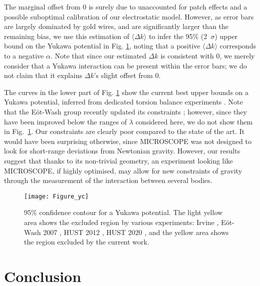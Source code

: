 \documentclass[12pt]{iopart}
\begin{document}
The marginal offset from 0 is surely due to unaccounted for patch effects and a possible suboptimal calibration of our electrostatic model. However, as error bars are largely dominated by gold wires, and are significantly larger than the remaining bias, we use this estimation of $\langle \Delta k \rangle$ to infer the 95\% (2~$\sigma$) upper bound on the Yukawa potential in Fig. \ref{fig_yc}, noting that a positive $\langle \Delta k \rangle$ corresponds to a negative $\alpha$.
Note that since our estimated $\Delta k$ is consistent with 0, we merely consider that a Yukawa interaction can be present within the error bars; we do not claim that it explains $\Delta k$'s slight offset from 0.

The curves in the lower part of Fig. \ref{fig_yc} show the current best upper bounds on a Yukawa potential, inferred from dedicated torsion balance experiments \cite{hoskins85, kapner07, yang12, tan20}. 
Note that the E\"ot-Wash group recently updated its constraints \cite{lee20}; however, since they have been improved below the ranges of $\lambda$ considered here, we do not show them in Fig.~\ref{fig_yc}.
Our constraints are clearly poor compared to the state of the art. It would have been surprising otherwise, since MICROSCOPE was not designed to look for short-range deviations from Newtonian gravity. However, our results suggest that thanks to its non-trivial geometry, an experiment looking like MICROSCOPE, if highly optimised, may allow for new constraints of gravity through the measurement of the interaction between several bodies.



\begin{figure}%
\begin{center}
\texttt{[image: Figure\_yc]}
\caption{95\% confidence contour for a Yukawa potential. The light yellow area shows the excluded region by various experiments: Irvine \cite{hoskins85}, E\"ot-Wash 2007 \cite{kapner07}, HUST 2012 \cite{yang12}, HUST 2020 \cite{tan20}, and the yellow area shows the region excluded by the current work.}
\label{fig_yc}
\end{center}
\end{figure}

\section{Conclusion} \label{sect_conclusion}
\end{document}
